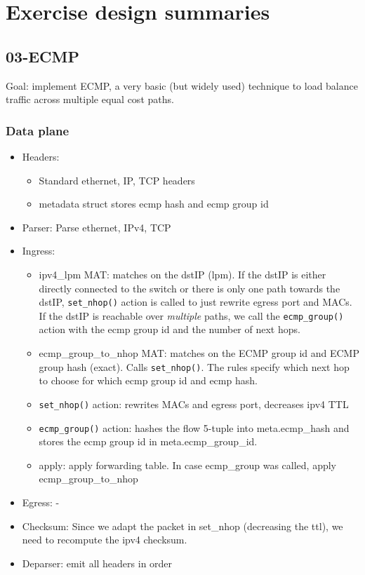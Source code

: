 \documentclass[11pt,oneside,a4paper]{article}
\begin{document}
\newpage

\section{Exercise design summaries}

\subsection{03-ECMP}
\label{03_ecmp}

Goal: implement ECMP, a very basic (but widely used) technique to load balance traffic across
multiple equal cost paths.

\subsubsection{Data plane}

\vspace{-\topsep}
\begin{itemize}
	\setlength{\itemsep}{0pt}
	\setlength{\parskip}{0pt}
	\item Headers:
	\begin{itemize}
		\setlength{\itemsep}{0pt}
		\setlength{\parskip}{0pt}
		\item Standard ethernet, IP, TCP headers
		\item metadata struct stores ecmp hash and ecmp group id
	\end{itemize}
	\item Parser: Parse ethernet, IPv4, TCP
	\item Ingress:
	\begin{itemize}
		\setlength{\itemsep}{0pt}
		\setlength{\parskip}{0pt}
		\item ipv4\_lpm MAT: matches on the dstIP (lpm). If the dstIP is either directly connected to the switch or there is only one path towards the dstIP, \texttt{set\_nhop()} action is called to just rewrite egress port and MACs. If the dstIP is reachable over \textit{multiple} paths, we call the \texttt{ecmp\_group()} action with the ecmp group id and the number of next hops.
		\item ecmp\_group\_to\_nhop MAT: matches on the ECMP group id and ECMP group hash (exact). Calls \texttt{set\_nhop()}. The rules specify which next hop to choose for which ecmp group id and ecmp hash.
		\item \texttt{set\_nhop()} action: rewrites MACs and egress port, decreases ipv4 TTL
		\item \texttt{ecmp\_group()} action: hashes the flow 5-tuple into meta.ecmp\_hash and stores the ecmp group id in meta.ecmp\_group\_id.
		\item apply: apply forwarding table. In case ecmp\_group was called, apply ecmp\_group\_to\_nhop
	\end{itemize}
	\item Egress: -
	\item Checksum: Since we adapt the packet in set\_nhop (decreasing the ttl), we need to recompute the ipv4 checksum.
	\item Deparser: emit all headers in order
\end{itemize}
\vspace{-\topsep}
\end{document}
